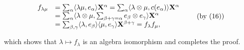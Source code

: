 \[
\begin{array}{r l} f _ {\lambda \mu} & = \sum_ {\alpha} \langle \lambda \mu , e _ {\alpha} \rangle \mathbf {X} ^ {\alpha} = \sum_ {\alpha} \langle \lambda \otimes \mu , c (e _ {\alpha}) \rangle \mathbf {X} ^ {\alpha} \\ & = \sum_ {\alpha} \langle \lambda \otimes \mu , \sum_ {\beta + \gamma = \alpha} e _ {\beta} \otimes e _ {\gamma} \rangle \mathbf {X} ^ {\alpha} \\ & = \sum_ {\beta , \gamma} \langle \lambda , e _ {\beta} \rangle \langle \mu , e _ {\gamma} \rangle \mathbf {X} ^ {\beta + \gamma} = f _ {\lambda} f _ {\mu}, \end{array}\tag{by (16)}
\]

which shows that \(\lambda \mapsto f_{\lambda}\) is an algebra isomorphism and completes the proof.

